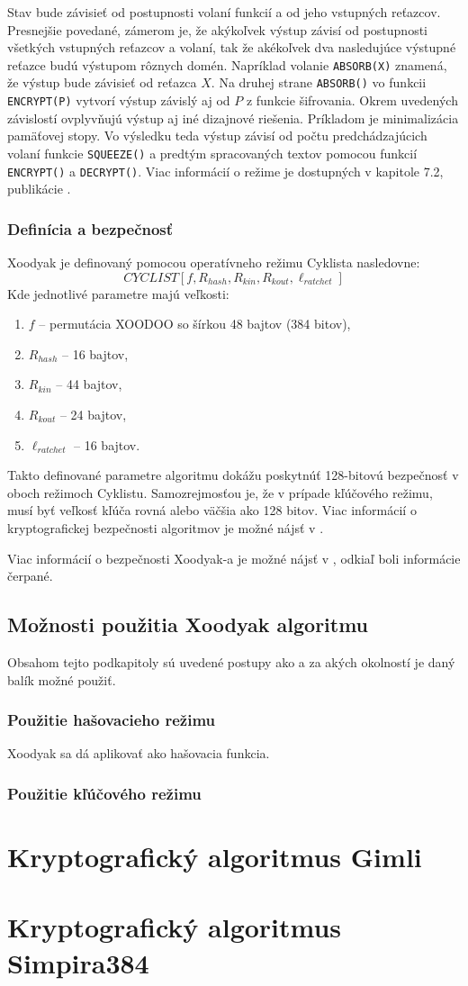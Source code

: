 Stav bude závisieť od postupnosti volaní funkcií a od jeho vstupných reťazcov. Presnejšie povedané, zámerom je, že akýkoľvek výstup závisí od postupnosti všetkých vstupných reťazcov a volaní, tak že akékoľvek dva nasledujúce výstupné reťazce budú výstupom rôznych domén. Napríklad volanie \lstinline|ABSORB(X)| znamená, že výstup bude závisieť od reťazca $X$. Na druhej strane \lstinline|ABSORB()| vo funkcii \lstinline|ENCRYPT(P)| vytvorí výstup závislý aj od $P$ z funkcie šifrovania. Okrem uvedených závislostí ovplyvňujú výstup aj iné dizajnové riešenia. Príkladom je minimalizácia pamäťovej stopy. Vo výsledku teda výstup závisí od počtu predchádzajúcich volaní funkcie \lstinline|SQUEEZE()| a predtým spracovaných textov pomocou funkcií \lstinline|ENCRYPT()| a \lstinline|DECRYPT()|. Viac informácií o režime je dostupných v kapitole 7.2, publikácie \cite{xcb}. 

\subsubsection{Definícia a bezpečnosť}
Xoodyak je definovaný pomocou operatívneho režimu Cyklista nasledovne:
\begin{equation}
	CYCLIST[f,R_{hash},R_{kin},R_{kout},\ell_{ratchet}]
\end{equation} 
Kde jednotlivé parametre majú veľkosti:
\begin{enumerate}
	\item $f$ -- permutácia XOODOO so šírkou 48 bajtov (384 bitov),
	\item $R_{hash}$ -- 16 bajtov,
	\item $R_{kin}$ -- 44 bajtov,
	\item $R_{kout}$ -- 24 bajtov,
	\item $\ell_{ratchet}$ -- 16 bajtov.  
\end{enumerate}
Takto definované parametre algoritmu dokážu poskytnúť 128-bitovú bezpečnosť v oboch režimoch Cyklistu. Samozrejmosťou je, že v prípade kľúčového režimu, musí byť veľkosť kľúča rovná alebo väčšia ako 128 bitov. Viac informácií o kryptografickej bezpečnosti algoritmov je možné nájsť v \cite{sec}.

Viac informácií o bezpečnosti Xoodyak-a je možné nájsť v \cite{xcb, 7.3}, odkiaľ boli informácie čerpané.

\subsection{Možnosti použitia Xoodyak algoritmu}
Obsahom tejto podkapitoly sú uvedené postupy ako a za akých okolností je daný balík možné použiť. 
\subsubsection{Použitie hašovacieho režimu}
Xoodyak sa dá aplikovať ako hašovacia funkcia.
\subsubsection{Použitie kľúčového režimu}
\section{Kryptografický algoritmus Gimli} 
\section{Kryptografický algoritmus Simpira384} 
